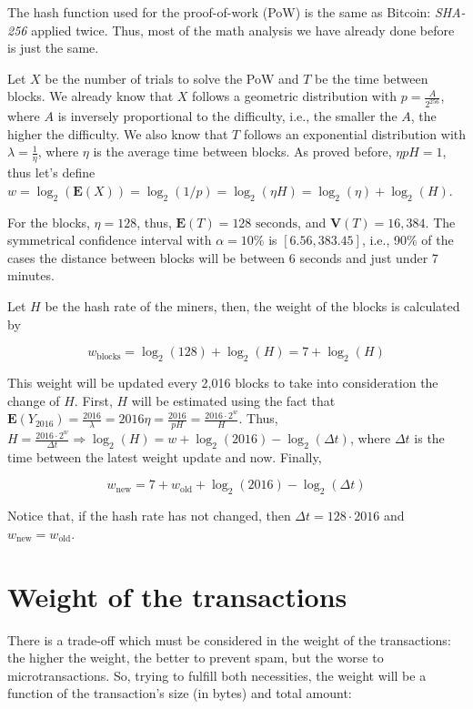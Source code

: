 The hash function used for the proof-of-work (PoW) is the same as Bitcoin: \emph{SHA-256} applied twice. Thus, most of the math analysis we have already done before is just the same.

Let $X$ be the number of trials to solve the PoW and $T$ be the time between blocks. We already know that $X$ follows a geometric distribution with $p = \frac{A}{2^{256}}$, where $A$ is inversely proportional to the difficulty, i.e., the smaller the $A$, the higher the difficulty. We also know that $T$ follows an exponential distribution with $\lambda = \frac{1}{\eta}$, where $\eta$ is the average time between blocks. As proved before, $\eta p H = 1$, thus let's define $w = \log_2(\mathbf{E}(X)) = \log_2(1/p) = \log_2(\eta H) = \log_2(\eta) + \log_2(H)$.

For the blocks, $\eta = 128$, thus, $\mathbf{E}(T) = 128 \text{ seconds}$, and $\mathbf{V}(T) = 16,384$. The symmetrical confidence interval with $\alpha = 10\%$ is $[6.56, 383.45]$, i.e., 90\% of the cases the distance between blocks will be between 6 seconds and just under 7 minutes.

Let $H$ be the hash rate of the miners, then, the weight of the blocks is calculated by

$$w_\text{blocks} = \log_2(128) + \log_2(H) = 7 + \log_2(H)$$

This weight will be updated every 2,016 blocks to take into consideration the change of $H$. First, $H$ will be estimated using the fact that $\mathbf{E}(Y_{2016}) = \frac{2016}{\lambda} = 2016 \eta = \frac{2016}{pH} = \frac{2016 \cdot 2^w}{H}$. Thus, $H = \frac{2016 \cdot 2^w}{\Delta t} \Rightarrow \log_2(H) = w + \log_2(2016) - \log_2(\Delta t)$, where $\Delta t$ is the time between the latest weight update and now. Finally,

$$w_\text{new} = 7 + w_\text{old} + \log_2(2016) - \log_2(\Delta t)$$

Notice that, if the hash rate has not changed, then $\Delta t = 128 \cdot 2016$ and $w_\text{new} = w_\text{old}$.


\section{Weight of the transactions}

There is a trade-off which must be considered in the weight of the transactions: the higher the weight, the better to prevent spam, but the worse to microtransactions. So, trying to fulfill both necessities, the weight will be a function of the transaction's size (in bytes) and total amount:

